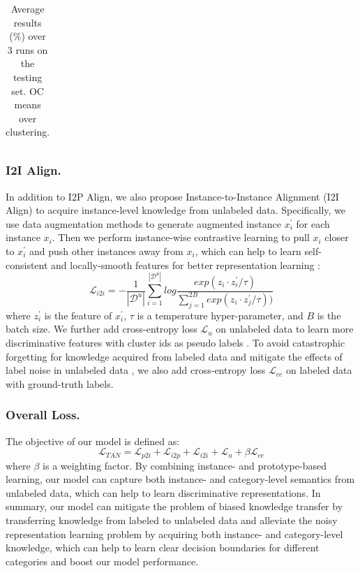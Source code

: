 \documentclass[letterpaper]{article} %
\begin{document}
\begin{table}
\begin{tabular}{lccccccccc}
\bottomrule

\end{tabular}
\caption{Average results (\%) over 3 runs on the testing set. OC means over clustering.}
\label{table1}
\end{table}










\subsubsection{I2I Align.}
In addition to I2P Align, we also propose Instance-to-Instance Alignment (I2I Align) to acquire instance-level knowledge from unlabeled data. Specifically, we use data augmentation methods to generate augmented instance $x_{i}^{\prime}$ for each instance $x_{i}$. Then we perform instance-wise contrastive learning \citep{infonce} to pull $x_{i}$ closer to $x_{i}^{\prime}$ and push other instances away from $x_{i}$, which can help to learn self-consistent and locally-smooth features for better representation learning \citep{pcl}:
\begin{equation}
\mathcal{L}_{i2i} = -\frac{1}{|\mathcal{D}^{u}|}\sum_{i=1}^{|\mathcal{D}^{u}|}log\frac{exp(z_{i} \cdot z_{i}^{\prime}/\tau)}{\sum_{j=1}^{2B}exp(z_{i} \cdot z_{j}^{\prime}/\tau))}
\end{equation}
where $z_{i}^{\prime}$ is the feature of $x_{i}^{\prime}$, $\tau$ is a temperature hyper-parameter, and $B$ is the batch size. We further add cross-entropy loss $\mathcal{L}_{u}$ on unlabeled data to learn more discriminative features with cluster ids as pseudo labels \citep{deepcluster}. 
To avoid catastrophic forgetting for knowledge acquired from labeled data and mitigate the effects of label noise in unlabeled data \citep{ptjn}, we also add cross-entropy loss $\mathcal{L}_{ce}$ on labeled data with ground-truth labels.

\subsubsection{Overall Loss.} The objective of our model is defined as:
\begin{equation}
\mathcal{L}_{TAN} = \mathcal{L}_{p2i} + \mathcal{L}_{i2p} + \mathcal{L}_{i2i} + \mathcal{L}_{u} + \beta \mathcal{L}_{ce}
\end{equation}
where $\beta$ is a weighting factor. By combining instance- and prototype-based learning, our model can capture both instance- and category-level semantics from unlabeled data, which can help to learn discriminative representations. 
In summary, our model can mitigate the problem of biased knowledge transfer by transferring knowledge from labeled to unlabeled data and alleviate the noisy representation learning problem by acquiring both instance- and category-level knowledge, which can help to learn clear decision boundaries for different categories and boost our model performance.
\end{document}
